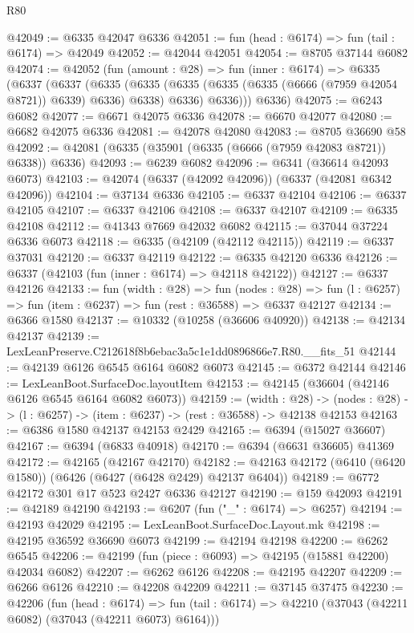 \begin{lexlean}{R80}
\begin{coremodule}
@42049 := @6335 @42047 @6336
@42051 := fun (head : @6174) => fun (tail : @6174) => @42049
@42052 := @42044 @42051
@42054 := @8705 @37144 @6082
@42074 := @42052
    (fun (amount : @28) =>
    fun (inner : @6174) =>
    @6335
      (@6337
        (@6337
          (@6335
            (@6335 (@6335 (@6335 (@6335 (@6666 (@7959 @42054 @8721)) @6339) @6336) @6338) @6336)
            @6336)))
      @6336)
@42075 := @6243 @6082
@42077 := @6671 @42075 @6336
@42078 := @6670 @42077
@42080 := @6682 @42075 @6336
@42081 := @42078 @42080
@42083 := @8705 @36690 @58
@42092 := @42081 (@6335 (@35901 (@6335 (@6666 (@7959 @42083 @8721)) @6338)) @6336)
@42093 := @6239 @6082
@42096 := @6341 (@36614 @42093 @6073)
@42103 := @42074 (@6337 (@42092 @42096)) (@6337 (@42081 @6342 @42096))
@42104 := @37134 @6336
@42105 := @6337 @42104
@42106 := @6337 @42105
@42107 := @6337 @42106
@42108 := @6337 @42107
@42109 := @6335 @42108
@42112 := @41343 @7669 @42032 @6082
@42115 := @37044 @37224 @6336 @6073
@42118 := @6335 (@42109 (@42112 @42115))
@42119 := @6337 @37031
@42120 := @6337 @42119
@42122 := @6335 @42120 @6336
@42126 := @6337 (@42103 (fun (inner : @6174) => @42118 @42122))
@42127 := @6337 @42126
@42133 := fun (width : @28) =>
  fun (nodes : @28) => fun (l : @6257) => fun (item : @6237) => fun (rest : @36588) => @6337 @42127
@42134 := @6366 @1580
@42137 := @10332 (@10258 (@36606 @40920))
@42138 := @42134 @42137
@42139 := LexLeanPreserve.C212618f8b6ebac3a5c1e1dd0896866e7.R80.__fits_51
@42144 := @42139 @6126 @6545 @6164 @6082 @6073
@42145 := @6372 @42144
@42146 := LexLeanBoot.SurfaceDoc.layoutItem
@42153 := @42145 (@36604 (@42146 @6126 @6545 @6164 @6082 @6073))
@42159 := (width : @28) ->
  (nodes : @28) -> (l : @6257) -> (item : @6237) -> (rest : @36588) -> @42138 @42153
@42163 := @6386 @1580 @42137 @42153 @2429
@42165 := @6394 (@15027 @36607)
@42167 := @6394 (@6833 @40918)
@42170 := @6394 (@6631 @36605) @41369
@42172 := @42165 (@42167 @42170)
@42182 := @42163 @42172 (@6410 (@6420 @1580)) (@6426 (@6427 (@6428 @2429) @42137 @6404))
@42189 := @6772 @42172 @301 @17 @523 @2427 @6336 @42127
@42190 := @159 @42093
@42191 := @42189 @42190
@42193 := @6207 (fun ("_" : @6174) => @6257)
@42194 := @42193 @42029
@42195 := LexLeanBoot.SurfaceDoc.Layout.mk
@42198 := @42195 @36592 @36690 @6073
@42199 := @42194 @42198
@42200 := @6262 @6545
@42206 := @42199 (fun (piece : @6093) => @42195 (@15881 @42200) @42034 @6082)
@42207 := @6262 @6126
@42208 := @42195 @42207
@42209 := @6266 @6126
@42210 := @42208 @42209
@42211 := @37145 @37475
@42230 := @42206
    (fun (head : @6174) =>
    fun (tail : @6174) => @42210 (@37043 (@42211 @6082) (@37043 (@42211 @6073) @6164)))

\end{coremodule}
\end{lexlean}
